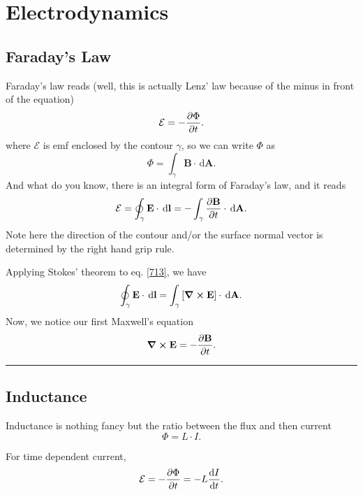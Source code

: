 \documentclass[12pt,english]{article}
\newcommand{\dmr}[1]{\, \mathrm{d}#1} %
\numberwithin{equation}{subsection}
\renewcommand{\vec}[1]{\mathbf{#1}}
\begin{document}
\section{Electrodynamics}
\subsection{Faraday's Law}
Faraday's law reads (well, this is actually Lenz' law because of the minus in front of the equation)
\begin{equation}
    \mathcal{E} = -\pdv{\Phi}{t}.
\end{equation}
where $\mathcal{E}$ is emf enclosed by the contour $\gamma$, so we can write $\Phi$ as 
\begin{equation}
    \Phi = \int_{\gamma} \vec{B} \cdot \dmr{\vec{A}}.
\end{equation}
And what do you know, there is an integral form of Faraday's law, and it reads
\begin{equation}
    \mathcal{E} = \oint_{\gamma} \vec{E} \cdot \dmr{\vec{l}} = -\int_{\gamma} \pdv{\vec{B}}{t}\cdot \dmr{\vec{A}}.\label{713}
\end{equation}
Note here the direction of the contour and/or the surface normal vector is determined by the right hand grip rule.

Applying Stokes' theorem to eq. \ref{713}, we have
\begin{equation}
    \oint_{\gamma} \vec{E} \cdot \dmr{\vec{l}} = \int_{\gamma} \left[\curl\vec{E}\right]\cdot\dmr{\vec{A}}.
\end{equation}
Now, we notice our first Maxwell's equation
\begin{equation}
    \curl\vec{E} = -\pdv{\vec{B}}{t}.
\end{equation}

\par\noindent\rule{\textwidth}{0.4pt}

\subsection{Inductance}
Inductance is nothing fancy but the ratio between the flux and then current
\begin{equation}
    \Phi = L\cdot I.
\end{equation}

For time dependent current, 
\begin{equation}
    \mathcal{E} = -\pdv{\Phi}{t} = -L\dv{I}{t}.
\end{equation}
\end{document}
